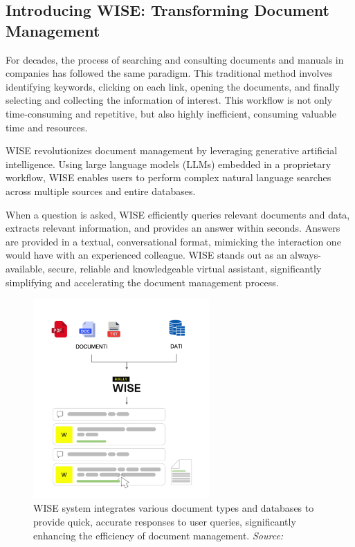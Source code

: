\subsection{Introducing WISE: Transforming Document Management}

For decades, the process of searching and consulting documents and manuals in companies has followed the same paradigm. This traditional method involves identifying keywords, clicking on each link, opening the documents, and finally selecting and collecting the information of interest. This workflow is not only time-consuming and repetitive, but also highly inefficient, consuming valuable time and resources.

WISE revolutionizes document management by leveraging generative artificial intelligence. Using large language models (LLMs) embedded in a proprietary workflow, WISE enables users to perform complex natural language searches across multiple sources and entire databases. 

When a question is asked, WISE efficiently queries relevant documents and data, extracts relevant information, and provides an answer within seconds. Answers are provided in a textual, conversational format, mimicking the interaction one would have with an experienced colleague. WISE stands out as an always-available, secure, reliable and knowledgeable virtual assistant, significantly simplifying and accelerating the document management process. \cite{hpa2024}

\begin{figure}[h!]
    \centering
    \includegraphics[width=0.6\textwidth]{images/wise/wise-schema-verticale.png}
    \caption{WISE system integrates various document types and databases to provide quick, accurate responses to user queries, significantly enhancing the efficiency of document management. \textit{Source:} \cite{hpa2024}}
    \label{fig:wise-schema}
\end{figure}

